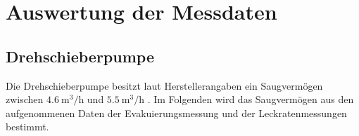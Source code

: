 \section{Auswertung der Messdaten}
\label{sec:Auswertung}
\subsection{Drehschieberpumpe}
Die Drehschieberpumpe besitzt laut Herstellerangaben ein Saugvermögen zwischen 
$\SI{4.6}{\cubic\metre\per\hour}$ und $\SI{5.5}{\cubic\metre\per\hour}$ \cite{Versuchsbeschreibung}.
Im Folgenden wird das Saugvermögen aus den aufgenommenen Daten der Evakuierungsmessung
und der Leckratenmessungen bestimmt. 

